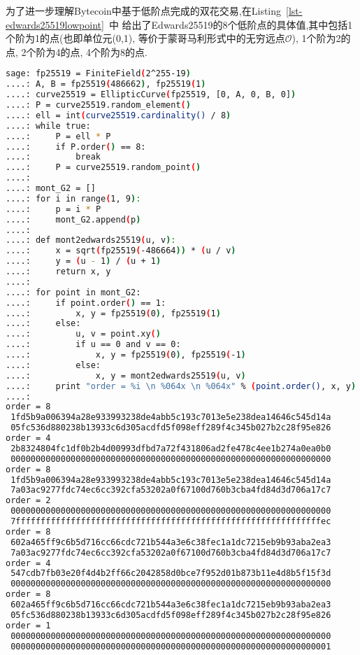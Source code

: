 \documentclass{article}
\begin{document}
为了进一步理解Bytecoin中基于低阶点完成的双花交易,在Listing~\ref{lst-edwards25519lowpoint}~中
给出了Edwards25519的8个低阶点的具体值,其中包括1个阶为1的点(也即单位元(0,1),
等价于蒙哥马利形式中的无穷远点$\mathcal{O}$), 1个阶为2的点, 2个阶为4的点, 4个阶为8的点.


\begin{lstlisting}[language=bash, caption=Edwards25519的低阶点, label=lst-edwards25519lowpoint]
sage: fp25519 = FiniteField(2^255-19)
....: A, B = fp25519(486662), fp25519(1)
....: curve25519 = EllipticCurve(fp25519, [0, A, 0, B, 0])
....: P = curve25519.random_element()
....: ell = int(curve25519.cardinality() / 8)
....: while true:
....:     P = ell * P
....:     if P.order() == 8:
....:         break
....:     P = curve25519.random_point()
....:
....: mont_G2 = []
....: for i in range(1, 9):
....:     p = i * P
....:     mont_G2.append(p)
....:
....: def mont2edwards25519(u, v):
....:     x = sqrt(fp25519(-486664)) * (u / v)
....:     y = (u - 1) / (u + 1)
....:     return x, y
....:
....: for point in mont_G2:
....:     if point.order() == 1:
....:         x, y = fp25519(0), fp25519(1)
....:     else:
....:         u, v = point.xy()
....:         if u == 0 and v == 0:
....:             x, y = fp25519(0), fp25519(-1)
....:         else:
....:             x, y = mont2edwards25519(u, v)
....:     print "order = %i \n %064x \n %064x" % (point.order(), x, y)
....:
order = 8
 1fd5b9a006394a28e933993238de4abb5c193c7013e5e238dea14646c545d14a
 05fc536d880238b13933c6d305acdfd5f098eff289f4c345b027b2c28f95e826
order = 4
 2b8324804fc1df0b2b4d00993dfbd7a72f431806ad2fe478c4ee1b274a0ea0b0
 0000000000000000000000000000000000000000000000000000000000000000
order = 8
 1fd5b9a006394a28e933993238de4abb5c193c7013e5e238dea14646c545d14a
 7a03ac9277fdc74ec6cc392cfa53202a0f67100d760b3cba4fd84d3d706a17c7
order = 2
 0000000000000000000000000000000000000000000000000000000000000000
 7fffffffffffffffffffffffffffffffffffffffffffffffffffffffffffffec
order = 8
 602a465ff9c6b5d716cc66cdc721b544a3e6c38fec1a1dc7215eb9b93aba2ea3
 7a03ac9277fdc74ec6cc392cfa53202a0f67100d760b3cba4fd84d3d706a17c7
order = 4
 547cdb7fb03e20f4d4b2ff66c2042858d0bce7f952d01b873b11e4d8b5f15f3d
 0000000000000000000000000000000000000000000000000000000000000000
order = 8
 602a465ff9c6b5d716cc66cdc721b544a3e6c38fec1a1dc7215eb9b93aba2ea3
 05fc536d880238b13933c6d305acdfd5f098eff289f4c345b027b2c28f95e826
order = 1
 0000000000000000000000000000000000000000000000000000000000000000
 0000000000000000000000000000000000000000000000000000000000000001
\end{lstlisting}
\end{document}
